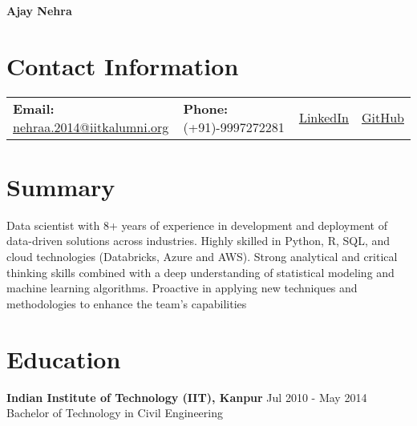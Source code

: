\documentclass[a4paper,10pt]{article}
\begin{document}
\begin{center}
    \textbf{\huge Ajay Nehra}
\end{center}

%

\section*{Contact Information}
\noindent
\begin{tabular*}{\linewidth}{@{\extracolsep{\fill}}lllr@{}}
    \textbf{Email:} \href{mailto:nehraa.2014@iitkalumni.org}{nehraa.2014@iitkalumni.org} &
    \textbf{Phone:} (+91)-9997272281 &
    \href{https://www.linkedin.com/in/ajay-n-575bba23/}{\textcolor[RGB]{10,102,194}{\underline{LinkedIn}}} &
    \href{https://github.com/ajaynehra}{\textcolor[RGB]{17,15,15}{\underline{GitHub}}}
\end{tabular*}





\section*{Summary}
Data scientist with 8+ years of experience in development and deployment of data-driven solutions across industries. Highly skilled in Python, R, SQL, and cloud technologies (Databricks, Azure and AWS). Strong analytical and critical thinking skills combined with a deep understanding of statistical modeling and machine learning algorithms. Proactive in  applying new techniques and methodologies to enhance the team's capabilities


\section*{Education}
\textbf{Indian Institute of Technology (IIT), Kanpur} \hfill \textnormal{Jul 2010 - May 2014} \\
Bachelor of Technology in Civil Engineering

\end{document}
